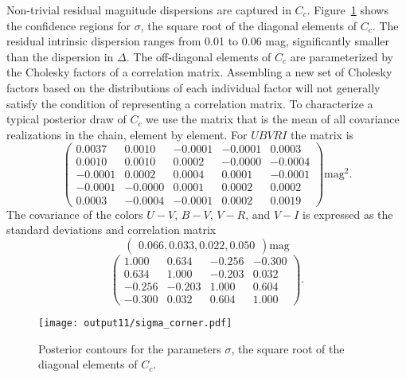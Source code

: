 \documentclass{aastex}   	%
\begin{document}
Non-trivial residual magnitude dispersions are captured in $C_c$.   Figure~\ref{sigma:fig} shows the confidence regions for $\sigma$, the
square root of the diagonal elements of $C_c$.  The residual intrinsic dispersion ranges from 0.01 to 0.06 mag, significantly smaller
than the dispersion in $\Delta$.
The off-diagonal elements of $C_c$ are parameterized by the Cholesky factors of a correlation matrix.
Assembling
a new set of Cholesky factors based on the distributions of each individual factor will not generally satisfy the condition of representing a correlation matrix.  
To characterize a typical posterior draw of $C_c$ we use the matrix that is the mean of all covariance realizations in the
chain, element by element.
For $UBVRI$ the matrix is
\begin{equation}
\begin{pmatrix}
0.0037 & 0.0010 & -0.0001 & -0.0001 & 0.0003 \\
0.0010 & 0.0010 & 0.0002 & -0.0000 & -0.0004 \\
-0.0001 & 0.0002 & 0.0004 & 0.0001 & -0.0001 \\
-0.0001 & -0.0000 & 0.0001 & 0.0002 & 0.0002 \\
0.0003 & -0.0004 & -0.0001 & 0.0002 & 0.0019
 \end{pmatrix} \text{mag}^2.
 \label{mag_cov:eqn}
 \end{equation}
The  covariance of the colors $U-V$, $B-V$, $V-R$, and $V-I$ is
expressed as the standard deviations and
 correlation matrix
 \begin{equation}
 \begin{pmatrix}
0.066 , 0.033 , 0.022 , 0.050 
  \end{pmatrix} \text{mag}
 \label{color_sd:eqn}
   \end{equation}
 \begin{equation}
\begin{pmatrix}
1.000 & 0.634 & -0.256 & -0.300 \\
0.634 & 1.000 & -0.203 & 0.032 \\
-0.256 & -0.203 & 1.000 & 0.604 \\
-0.300 & 0.032 & 0.604 & 1.000
  \end{pmatrix}.
  \label{color_cor:eqn}
 \end{equation}
 
 \begin{figure}[htbp] %
   \centering
   \texttt{[image: output11/sigma\_corner.pdf]} 
   \caption{Posterior contours for the parameters $\sigma$, the square root of the diagonal elements of $C_c$.
   \label{sigma:fig}}
\end{figure}
\end{document}
